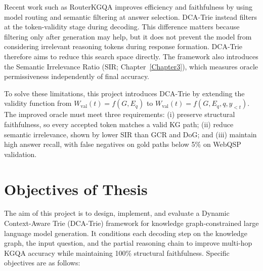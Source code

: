Recent work such as RouterKGQA \citep{yuan2026routerkgqa} improves efficiency and faithfulness by using model routing and semantic filtering at answer selection. DCA-Trie instead filters at the token-validity stage during decoding. This difference matters because filtering only after generation may help, but it does not prevent the model from considering irrelevant reasoning tokens during response formation. DCA-Trie therefore aims to reduce this search space directly. The framework also introduces the Semantic Irrelevance Ratio (SIR; Chapter~\ref{Chapter3}), which measures oracle permissiveness independently of final accuracy.

To solve these limitations, this project introduces DCA-Trie by extending the validity function from $W_{\mathrm{val}}(t) = f(G, E_q)$ to $W_{\mathrm{val}}(t) = f(G, E_q, q, y_{<t})$. The improved oracle must meet three requirements: (i) preserve structural faithfulness, so every accepted token matches a valid KG path; (ii) reduce semantic irrelevance, shown by lower SIR than GCR and DoG; and (iii) maintain high answer recall, with false negatives on gold paths below 5\% on WebQSP validation.

\section{Objectives of Thesis}

The aim of this project is to design, implement, and evaluate a Dynamic Context-Aware Trie (DCA-Trie) framework for knowledge graph-constrained large language model generation. It conditions each decoding step on the knowledge graph, the input question, and the partial reasoning chain to improve multi-hop KGQA accuracy while maintaining 100\% structural faithfulness. Specific objectives are as follows:

